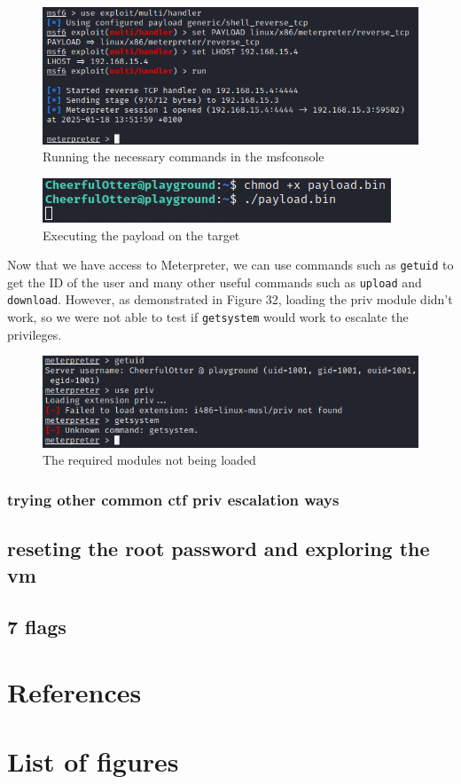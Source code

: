 \documentclass[a4paper]{article}
\newcommand{\abc}{\hfill \break}
\begin{document}
\begin{figure}[ht]
	\includegraphics[scale=0.5]{images/msfc.png}
	\centering
	\caption{Running the necessary commands in the msfconsole}
\end{figure}
\begin{figure}[h]
	\includegraphics[scale=0.8]{images/ep.png}
	\centering
	\caption{Executing the payload on the target}
\end{figure}\abc
Now that we have access to Meterpreter, we can use commands such as \texttt{getuid} to get the ID of the user and many other useful commands such as \texttt{upload} and \texttt{download}. However, as demonstrated in Figure 32, loading the priv module didn't work, so we were not able to test if \texttt{getsystem} would work to escalate the privileges.
\begin{figure}[h]
	\includegraphics[scale=0.51]{images/RadagJuice.png}
	\centering
	\caption{The required modules not being loaded}
\end{figure}\abc
\newpage
\subsubsection{trying other common ctf priv escalation ways}
\subsection{reseting the root password and exploring the vm}
\subsection{7 flags}
\newpage
\section{References}

\newpage
\section{List of figures}

\listoffigures
\end{document}
